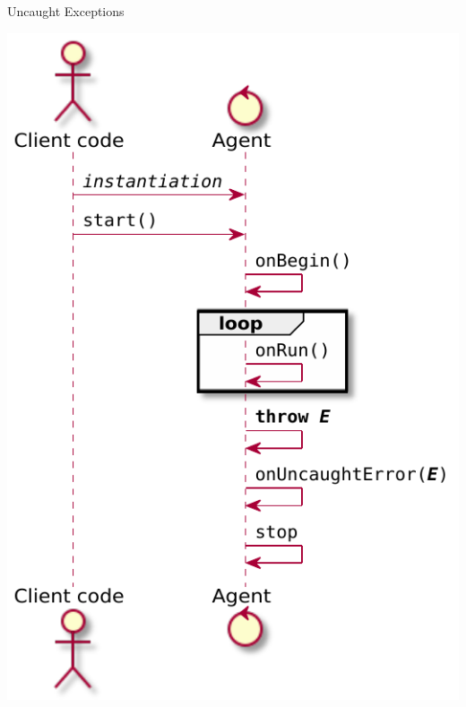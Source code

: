 \documentclass[presentation]{beamer}\mode<presentation>{\usetheme{AMSCesenaPurpleAndGold}}
\begin{document}
\begin{frame}[allowframebreaks]{Uncaught Exceptions}
    \begin{center}
    	\includegraphics[height=.8\textheight]{img/exceptional-flow-2.pdf}
    \end{center}
    

\end{frame}
\end{document}

